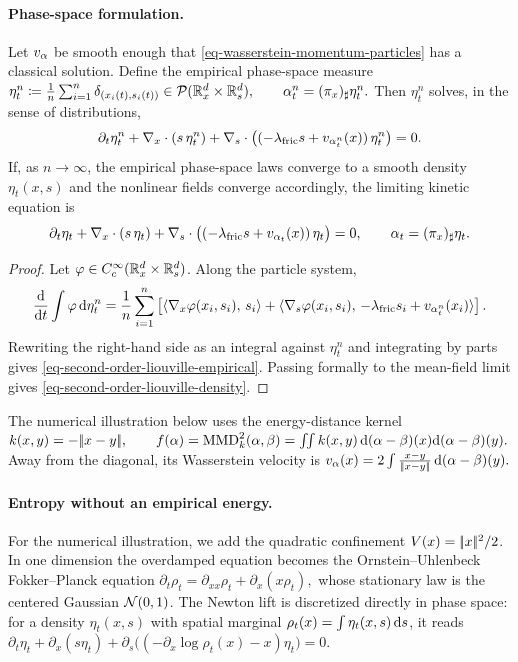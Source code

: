 \paragraph{Phase-space formulation.}
\begin{prop}\label{prop-second-order-liouville}
Let $v_\alpha$ be smooth enough that \eqref{eq-wasserstein-momentum-particles} has a classical solution. Define the empirical phase-space measure
\(\eta_t^n \coloneqq \frac1n\sum_{i=1}^n\delta_{(x_i(t),s_i(t))} \in \mathcal{P}(\mathbb{R}^d_x\times\mathbb{R}^d_s), \qquad \alpha_t^n=(\pi_x)_\sharp\eta_t^n.\)
Then $\eta_t^n$ solves, in the sense of distributions,
\begin{equation}\label{eq-second-order-liouville-empirical}
\partial_t\eta_t^n
+
\nabla_x\cdot(s\,\eta_t^n)
+
\nabla_s\cdot\bigl((-\lambda_{\rm fric} s+v_{\alpha_t^n}(x))\,\eta_t^n\bigr)
=0.
\end{equation}
If, as $n\to\infty$, the empirical phase-space laws converge to a smooth density $\eta_t(x,s)$ and the nonlinear fields converge accordingly, the limiting kinetic equation is
\begin{equation}\label{eq-second-order-liouville-density}
\partial_t\eta_t
+
\nabla_x\cdot(s\,\eta_t)
+
\nabla_s\cdot\bigl((-\lambda_{\rm fric} s+v_{\alpha_t}(x))\,\eta_t\bigr)
=0,
\qquad
\alpha_t=(\pi_x)_\sharp\eta_t.
\end{equation}
\end{prop}
\begin{proof}
Let $\varphi\in C_c^\infty(\mathbb{R}^d_x\times\mathbb{R}^d_s)$. Along the particle system,
\[
\frac{\mathrm{d}}{\mathrm{d} t}
\int \varphi\,\mathrm{d}\eta_t^n
=
\frac1n\sum_{i=1}^n
\left[
\langle \nabla_x\varphi(x_i,s_i),\,s_i\rangle
+
\langle \nabla_s\varphi(x_i,s_i),\,-\lambda_{\rm fric} s_i+v_{\alpha_t^n}(x_i)\rangle
\right].
\]
Rewriting the right-hand side as an integral against $\eta_t^n$ and integrating by parts gives \eqref{eq-second-order-liouville-empirical}. Passing formally to the mean-field limit gives \eqref{eq-second-order-liouville-density}.
\end{proof}
The numerical illustration below uses the energy-distance kernel
\(k(x,y)=-|\!| x-y |\!|, \qquad f(\alpha)=\operatorname{MMD}_k^2(\alpha,\beta) = \iint k(x,y)\,\mathrm{d}(\alpha-\beta)(x)\mathrm{d}(\alpha-\beta)(y).\)
Away from the diagonal, its Wasserstein velocity is \(v_\alpha(x) = 2\int \frac{x-y}{|\!| x-y |\!|}\,\mathrm{d}(\alpha-\beta)(y).\)
\paragraph{Entropy without an empirical energy.}
For the numerical illustration, we add the quadratic confinement $V(x)=|\!| x |\!|^2/2$. In one dimension the overdamped equation becomes the Ornstein--Uhlenbeck Fokker--Planck equation
\(\partial_t\rho_t=\partial_{xx}\rho_t+\partial_x(x\rho_t),\)
whose stationary law is the centered Gaussian $\mathcal{N}(0,1)$. The Newton lift is discretized directly in phase space: for a density $\eta_t(x,s)$ with spatial marginal $\rho_t(x)=\int\eta_t(x,s)\,\mathrm{d} s$, it reads
\(\partial_t\eta_t+\partial_x(s\eta_t)+\partial_s\bigl((-\partial_x\log\rho_t(x)-x)\eta_t\bigr)=0.\)
